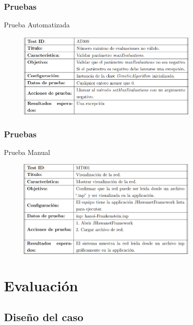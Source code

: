 \documentclass[9pt]{beamer}
\begin{document}
    \begin{frame}
        \frametitle{Pruebas}     
        Prueba Automatizada
        \begin{figure}
            \includegraphics[width=0.8\textwidth]{assets/PruebaAutomatizada.png}
        \end{figure}
        
    \end{frame}

    \begin{frame}
        \frametitle{Pruebas}     
        Prueba Manual
        \begin{figure}
            \includegraphics[width=0.8\textwidth]{assets/PruebaManual.png}
        \end{figure}
        
    \end{frame}

    \section{Evaluación}
    \subsection{Diseño del caso}
\end{document}
